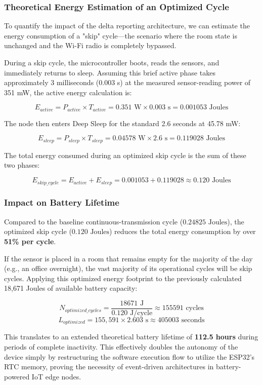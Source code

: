 \documentclass[12pt]{article}
\begin{document}
\subsubsection*{Theoretical Energy Estimation of an Optimized Cycle}

To quantify the impact of the delta reporting architecture, we can estimate the energy consumption of a "skip" cycle—the scenario where the room state is unchanged and the Wi-Fi radio is completely bypassed. 

During a skip cycle, the microcontroller boots, reads the sensors, and immediately returns to sleep. Assuming this brief active phase takes approximately 3 milliseconds (0.003 s) at the measured sensor-reading power of 351 mW, the active energy calculation is:

$$E_{active} = P_{active} \times T_{active} = 0.351\text{ W} \times 0.003\text{ s} = 0.001053\text{ Joules}$$

The node then enters Deep Sleep for the standard 2.6 seconds at 45.78 mW:

$$E_{sleep} = P_{sleep} \times T_{sleep} = 0.04578\text{ W} \times 2.6\text{ s} = 0.119028\text{ Joules}$$

The total energy consumed during an optimized skip cycle is the sum of these two phases:

$$E_{skip\_cycle} = E_{active} + E_{sleep} = 0.001053 + 0.119028 \approx 0.120\text{ Joules}$$

\subsubsection*{Impact on Battery Lifetime}
Compared to the baseline continuous-transmission cycle ($0.24825\text{ Joules}$), the optimized skip cycle ($0.120\text{ Joules}$) reduces the total energy consumption by over \textbf{51\% per cycle}. 

If the sensor is placed in a room that remains empty for the majority of the day (e.g., an office overnight), the vast majority of its operational cycles will be skip cycles. Applying this optimized energy footprint to the previously calculated 18,671 Joules of available battery capacity:

$$N_{optimized\_cycles} = \frac{18671\text{ J}}{0.120\text{ J/cycle}} \approx 155591\text{ cycles}$$
$$L_{optimized} = 155,591 \times 2.603\text{ s} \approx 405003\text{ seconds}$$

This translates to an extended theoretical battery lifetime of \textbf{112.5 hours} during periods of complete inactivity. This effectively doubles the autonomy of the device simply by restructuring the software execution flow to utilize the ESP32's RTC memory, proving the necessity of event-driven architectures in battery-powered IoT edge nodes.
\end{document}
